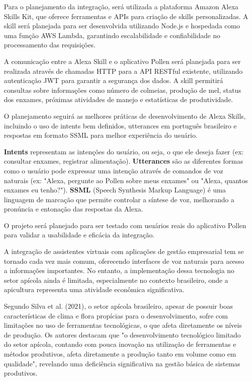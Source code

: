 Para o planejamento da integração, será utilizada a plataforma Amazon Alexa Skills Kit, 
que oferece ferramentas e APIs para criação de skills personalizadas. A skill será planejada para ser desenvolvida utilizando Node.js 
e hospedada como uma função AWS Lambda, garantindo escalabilidade e confiabilidade no processamento das requisições.

A comunicação entre a Alexa Skill e o aplicativo Pollen será planejada para ser realizada através de chamadas HTTP para a API RESTful existente, 
utilizando autenticação JWT para garantir a segurança dos dados. A skill permitirá consultas sobre informações como 
número de colmeias, produção de mel, status dos enxames, próximas atividades de manejo e estatísticas de produtividade.

O planejamento seguirá as melhores práticas de desenvolvimento de Alexa Skills, incluindo o uso de intents bem definidos, 
utterances em português brasileiro e respostas em formato SSML para melhor experiência do usuário. 

\textbf{Intents} representam as intenções do usuário, ou seja, o que ele deseja fazer (ex: consultar enxames, registrar alimentação). 
\textbf{Utterances} são as diferentes formas como o usuário pode expressar uma intenção através de comandos de voz naturais 
(ex: "Alexa, pergunte ao Pollen sobre meus enxames" ou "Alexa, quantos enxames eu tenho?"). 
\textbf{SSML} (Speech Synthesis Markup Language) é uma linguagem de marcação que permite controlar a síntese de voz, 
melhorando a pronúncia e entonação das respostas da Alexa.

O projeto será planejado para ser testado com usuários reais do aplicativo Pollen para validar a usabilidade e eficácia da integração.




\label{sec:problema-pesquisa-justificativa}

A integração de assistentes virtuais com aplicações de gestão empresarial tem se tornado cada vez mais comum, 
oferecendo interfaces de voz naturais para acesso a informações importantes. No entanto, a implementação dessa tecnologia no setor apícola 
ainda é limitada, especialmente no contexto brasileiro, onde a apicultura representa uma atividade econômica significativa.

Segundo Silva et al. (2021), o setor apícola brasileiro, apesar de possuir boas características de clima e flora propícias para o desenvolvimento, 
sofre com limitações no uso de ferramentas tecnológicas, o que afeta diretamente os níveis de produção. Os autores destacam que 
"o desenvolvimento tecnológico limitado do setor apícola, contando com pouca inovação na utilização de ferramentas e métodos produtivos, 
afeta diretamente a produção tanto em volume como em qualidade", revelando uma deficiência significativa na gestão básica de sistemas produtivos.

